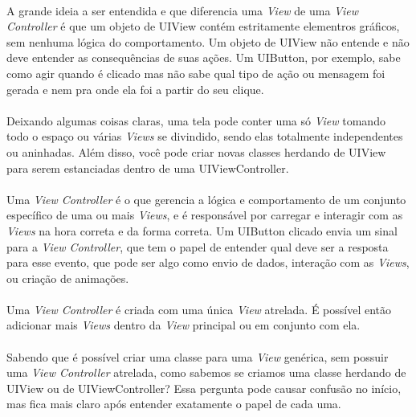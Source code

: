\documentclass[a4paper,12pt,brazil,doubleside]{book}
\begin{document}
\paragraph{}A grande ideia a ser entendida e que diferencia uma \emph{View} de uma \emph{View Controller} é que um objeto de UIView contém estritamente elementros gráficos, sem nenhuma lógica do comportamento. Um objeto de UIView não entende e não deve entender as consequências de suas ações. Um UIButton, por exemplo, sabe como agir quando é clicado mas não sabe qual tipo de ação ou mensagem foi gerada e nem pra onde ela foi a partir do seu clique.
\paragraph{}Deixando algumas coisas claras, uma tela pode conter uma só \emph{View} tomando todo o espaço ou várias \emph{Views} se divindido, sendo elas totalmente independentes ou aninhadas. Além disso, você pode criar novas classes herdando de UIView para serem estanciadas dentro de uma UIViewController.\\

\paragraph{}Uma \emph{View Controller} é o que gerencia a lógica e comportamento de um conjunto específico de uma ou mais \emph{Views}, e é responsável por carregar e interagir com as \emph{Views} na hora correta e da forma correta. Um UIButton clicado envia um sinal para a \emph{View Controller}, que tem o papel de entender qual deve ser a resposta para esse evento, que pode ser algo como envio de dados, interação com as \emph{Views}, ou criação de animações.
\paragraph{}Uma \emph{View Controller} é criada com uma única \emph{View} atrelada. É possível então adicionar mais \emph{Views} dentro da \emph{View} principal ou em conjunto com ela.
\paragraph{}Sabendo que é possível criar uma classe para uma \emph{View} genérica, sem possuir uma \emph{View Controller} atrelada, como sabemos se criamos uma classe herdando de UIView ou de UIViewController? Essa pergunta pode causar confusão no início, mas fica mais claro após entender exatamente o papel de cada uma.
\end{document}
